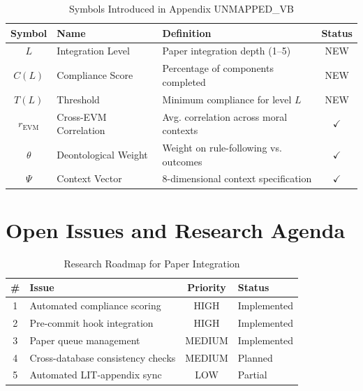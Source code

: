 \begin{table}[htbp]
\centering
\caption{Symbols Introduced in Appendix UNMAPPED_VB}
\label{tab:paperint-symbols}
\renewcommand{\arraystretch}{1.3}
\begin{tabular}{@{}clp{6cm}c@{}}
\toprule
\textbf{Symbol} & \textbf{Name} & \textbf{Definition} & \textbf{Status} \\
\midrule
$L$ & Integration Level & Paper integration depth (1--5) & NEW \\
$C(L)$ & Compliance Score & Percentage of components completed & NEW \\
$T(L)$ & Threshold & Minimum compliance for level $L$ & NEW \\
$r_{\text{EVM}}$ & Cross-EVM Correlation & Avg. correlation across moral contexts & $\checkmark$ \\
$\theta$ & Deontological Weight & Weight on rule-following vs. outcomes & $\checkmark$ \\
$\Psi$ & Context Vector & 8-dimensional context specification & $\checkmark$ \\
\bottomrule
\end{tabular}
\end{table}


\section{Open Issues and Research Agenda}
\label{sec:paperint-open}

\begin{table}[htbp]
\centering
\caption{Research Roadmap for Paper Integration}
\label{tab:paperint-roadmap}
\renewcommand{\arraystretch}{1.3}
\begin{tabular}{@{}clcl@{}}
\toprule
\textbf{\#} & \textbf{Issue} & \textbf{Priority} & \textbf{Status} \\
\midrule
1 & Automated compliance scoring & HIGH & Implemented \\
2 & Pre-commit hook integration & HIGH & Implemented \\
3 & Paper queue management & MEDIUM & Implemented \\
4 & Cross-database consistency checks & MEDIUM & Planned \\
5 & Automated LIT-appendix sync & LOW & Partial \\
\bottomrule
\end{tabular}
\end{table}


